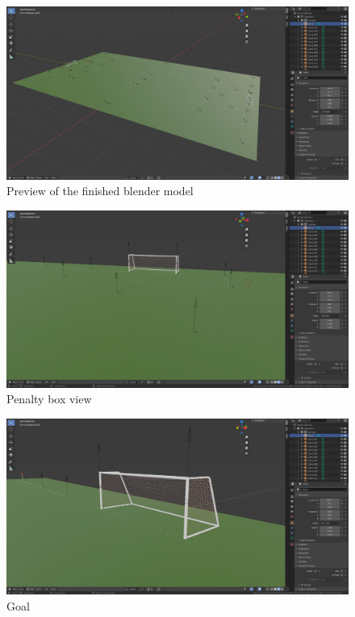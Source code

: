 \documentclass[
    11pt,
    oneside
]{report}
\begin{document}
\begin{appendices}
\begin{figure}[H]
    \includegraphics[keepaspectratio, width=\columnwidth]{Screenshot_2022-03-05_12-03-42.png}
    \caption{Preview of the finished blender model}
    \label{img:blender_preview}
\end{figure}


\begin{figure}[H]
    \includegraphics[keepaspectratio, width=\columnwidth]{Screenshot_2022-03-05_12-45-59.png}
    \caption{Penalty box view}
    \label{img:penalty_box}
\end{figure}


\begin{figure}[H]
    \includegraphics[keepaspectratio, width=\columnwidth]{Screenshot_2022-03-05_12-47-42.png}
    \caption{Goal}
    \label{img:goal}
\end{figure}


\end{appendices}
\end{document}
